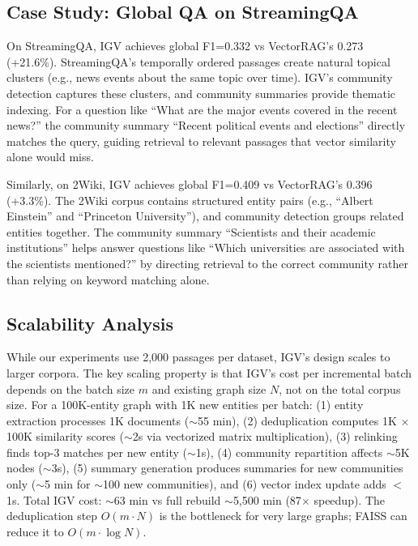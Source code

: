 \documentclass[sigconf,anonymous,review]{acmart}
\begin{document}
\subsection{Case Study: Global QA on StreamingQA}

On StreamingQA, IGV achieves global F1=0.332 vs VectorRAG's 0.273 (+21.6\%). StreamingQA's temporally ordered passages create natural topical clusters (e.g., news events about the same topic over time). IGV's community detection captures these clusters, and community summaries provide thematic indexing. For a question like ``What are the major events covered in the recent news?'' the community summary ``Recent political events and elections'' directly matches the query, guiding retrieval to relevant passages that vector similarity alone would miss.

Similarly, on 2Wiki, IGV achieves global F1=0.409 vs VectorRAG's 0.396 (+3.3\%). The 2Wiki corpus contains structured entity pairs (e.g., ``Albert Einstein'' and ``Princeton University''), and community detection groups related entities together. The community summary ``Scientists and their academic institutions'' helps answer questions like ``Which universities are associated with the scientists mentioned?'' by directing retrieval to the correct community rather than relying on keyword matching alone.

\subsection{Scalability Analysis}

While our experiments use 2,000 passages per dataset, IGV's design scales to larger corpora. The key scaling property is that IGV's cost per incremental batch depends on the batch size $m$ and existing graph size $N$, not on the total corpus size. For a 100K-entity graph with 1K new entities per batch: (1) entity extraction processes 1K documents ($\sim$55 min), (2) deduplication computes 1K $\times$ 100K similarity scores ($\sim$2s via vectorized matrix multiplication), (3) relinking finds top-3 matches per new entity ($\sim$1s), (4) community repartition affects $\sim$5K nodes ($\sim$3s), (5) summary generation produces summaries for new communities only ($\sim$5 min for $\sim$100 new communities), and (6) vector index update adds $<$1s. Total IGV cost: $\sim$63 min vs full rebuild $\sim$5,500 min (87$\times$ speedup). The deduplication step $O(m \cdot N)$ is the bottleneck for very large graphs; FAISS can reduce it to $O(m \cdot \log N)$.
\end{document}
